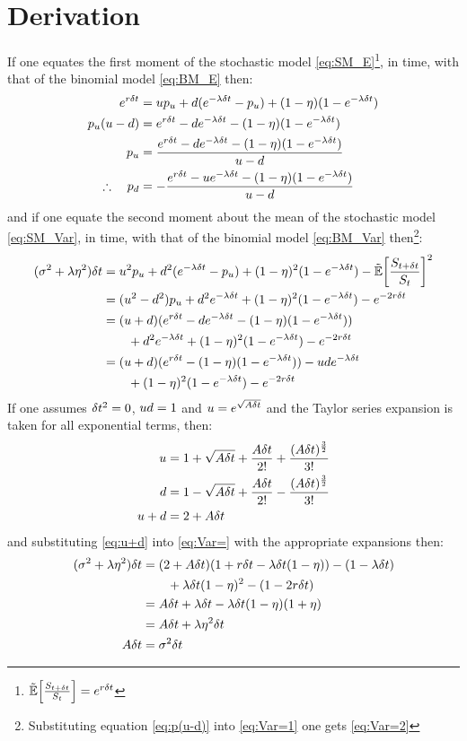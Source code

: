 \documentclass[a4paper,11pt,oneside]{report}
\theoremstyle{plain}
\theoremstyle{definition}
\begin{document}
\section{Derivation}
If one equates the first moment of the stochastic model \eqref{eq:SM_E}\footnote{$\E[\frac{\SDt}{\S}] = e^{r\Dt}$}, in \Dt time, with that of the binomial model \eqref{eq:BM_E} then:
\begin{align}
 e^{r\delta t}       &= up_u + d(e^{-\lambda\delta t} - p_u) + (1 - \eta)(1 - e^{-\lambda\delta t}) \nonumber\\
 p_u(u - d)   &= e^{r\delta t} - d e^{-\lambda\delta t} - (1 - \eta)(1 - e^{-\lambda\delta t}) \label{eq:p(u-d)}\\
 p_u            &= \frac{e^{r\delta t} - d e^{-\lambda\delta t} - (1 - \eta)(1 - e^{-\lambda\delta t})}{u - d} \\
 \therefore\quad p_d &= -\frac{e^{r\delta t} - u e^{-\lambda\delta t} - (1 - \eta)(1 - e^{-\lambda\delta t})}{u - d}
\end{align}
and if one equate the second moment about the mean of the stochastic model \eqref{eq:SM_Var}, in \Dt time, with that of the binomial model \eqref{eq:BM_Var} then\footnote{Substituting equation \eqref{eq:p(u-d)} into \eqref{eq:Var=1} one gets \eqref{eq:Var=2}}:
\begin{align}
 (\sigma^2 + \lambda\eta^2)\Dt &= \u^2\pu + \d^2(e^{-\lambda\Dt} - \pu) + (1 - \eta)^2(1 - e^{-\lambda\Dt}) - \E[\frac{\SDt}{\S}]^2 \n
                        &= (\u^2 - \d^2)\pu + \d^2 e^{-\lambda\Dt} +  (1 - \eta)^2(1 - e^{-\lambda\Dt}) - e^{-2r\Dt} \label{eq:Var=1} \\
                        &= (\u + \d)(e^{r\Dt} - \d e^{-\lambda\Dt} - (1 - \eta)(1 - e^{-\lambda\Dt})) \label{eq:Var=2} \\
                        &\qquad + \d^2 e^{-\lambda\Dt} + (1 - \eta)^2(1 - e^{-\lambda\Dt}) - e^{-2r\Dt} \n
                        &= (\u + \d)(e^{r\Dt} - (1 - \eta)(1 - e^{-\lambda\Dt})) - \u\d e^{-\lambda\Dt} \label{eq:Var=} \\
                        &\qquad + (1 - \eta)^2(1 - e^{-\lambda\Dt}) - e^{-2r\Dt} \nonumber
\end{align}
If one assumes $\delta t^2 = 0$, $ud = 1$ and $u = e^{\sqrt{A\delta t}}$ and the Taylor series expansion is taken for all exponential terms, then:
\begin{align}
 u                     &= 1 + \sqrt{A\delta t} + \frac{A\delta t}{2!} + \frac{(A\delta t)^{\frac{3}{2}}}{3!} \nonumber\\
 d                     &= 1 - \sqrt{A\delta t} + \frac{A\delta t}{2!} - \frac{(A\delta t)^{\frac{3}{2}}}{3!} \nonumber\\
 u + d                &= 2 + A\delta t \label{eq:u+d}
\end{align}
and substituting \eqref{eq:u+d} into \eqref{eq:Var=} with the appropriate expansions then:
\begin{align}
 (\sigma^2 + \lambda\eta^2)\delta t &= (2 + A\delta t)(1 + r\delta t - \lambda\delta t(1 - \eta)) - (1 - \lambda\delta t) \nonumber\\
                        &\qquad + \lambda\delta t(1 - \eta)^2 - (1 - 2r\delta t) \nonumber\\
                        &= A\delta t + \lambda\delta t - \lambda\delta t(1 - \eta)(1 + \eta) \nonumber\\
                        &= A\delta t + \lambda\eta^2\delta t \nonumber\\
 A\delta t                   &= \sigma^2\delta t
\end{align}
\end{document}
